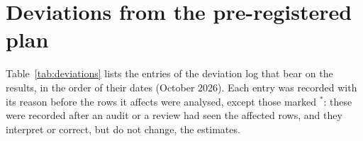 \appendix

\section{Deviations from the pre-registered plan}\label{app:deviations}

Table~\ref{tab:deviations} lists the entries of the deviation log that bear on the results, in the order of their
dates (October 2026). Each entry was recorded with its reason before the rows it affects were analysed, except those
marked $^{\ast}$: these were recorded after an audit or a review had seen the affected rows, and they interpret or
correct, but do not change, the estimates.

